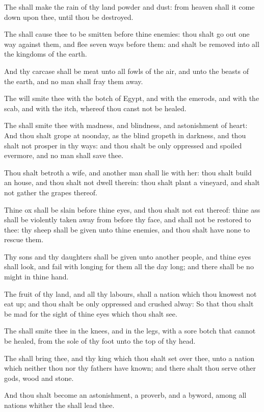 \Verse The \LORD shall make the rain of thy land powder and dust: from heaven shall it come down upon thee, until thou be destroyed.

\Verse The \LORD shall cause thee to be smitten before thine enemies: thou shalt go out one way against them, and flee seven ways before them: and shalt be removed into all the kingdoms of the earth.

\Verse And thy carcase shall be meat unto all fowls of the air, and unto the beasts of the earth, and no man shall fray them away.

\Verse The \LORD will smite thee with the botch of Egypt, and with the emerods, and with the scab, and with the itch, whereof thou canst not be healed.

\Verse The \LORD shall smite thee with madness, and blindness, and astonishment of heart: \Verse And thou shalt grope at noonday, as the blind gropeth in darkness, and thou shalt not prosper in thy ways: and thou shalt be only oppressed and spoiled evermore, and no man shall save thee.

\Verse Thou shalt betroth a wife, and another man shall lie with her: thou shalt build an house, and thou shalt not dwell therein: thou shalt plant a vineyard, and shalt not gather the grapes thereof.

\Verse Thine ox shall be slain before thine eyes, and thou shalt not eat thereof: thine ass shall be violently taken away from before thy face, and shall not be restored to thee: thy sheep shall be given unto thine enemies, and thou shalt have none to rescue them.

\Verse Thy sons and thy daughters shall be given unto another people, and thine eyes shall look, and fail with longing for them all the day long; and there shall be no might in thine hand.

\Verse The fruit of thy land, and all thy labours, shall a nation which thou knowest not eat up; and thou shalt be only oppressed and crushed alway: \Verse So that thou shalt be mad for the sight of thine eyes which thou shalt see.

\Verse The \LORD shall smite thee in the knees, and in the legs, with a sore botch that cannot be healed, from the sole of thy foot unto the top of thy head.

\Verse The \LORD shall bring thee, and thy king which thou shalt set over thee, unto a nation which neither thou nor thy fathers have known; and there shalt thou serve other gods, wood and stone.

\Verse And thou shalt become an astonishment, a proverb, and a byword, among all nations whither the \LORD shall lead thee.

